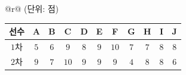 {\renewcommand{\arraystretch}{1.25}\small
\begin{tabular}{@{}r@{}}
{\footnotesize (단위: 점)} \\[1pt]
\begin{tabular}{|c|c|c|c|c|c|c|c|c|c|c|}
\hline
선수 & A & B & C & D & E & F & G & H & I & J \\ \hline
$1$차 & $5$ & $6$ & $9$ & $8$ & $9$ & $10$ & $7$ & $7$ & $8$ & $8$ \\ \hline
$2$차 & $9$ & $7$ & $10$ & $9$ & $9$ & $9$ & $4$ & $8$ & $8$ & $6$ \\ \hline
\end{tabular}
\end{tabular}}
